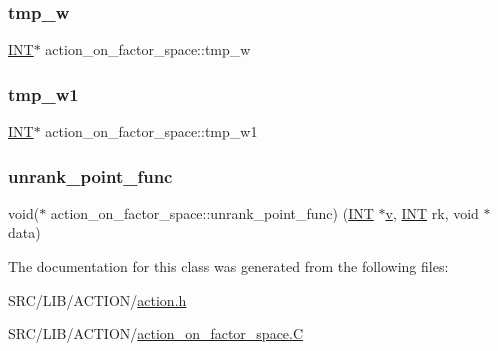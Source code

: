 \subsubsection{\texorpdfstring{tmp\+\_\+w}{tmp\_w}}
{\footnotesize\ttfamily \mbox{\hyperlink{galois_8h_a09fddde158a3a20bd2dcadb609de11dc}{I\+NT}}$\ast$ action\+\_\+on\+\_\+factor\+\_\+space\+::tmp\+\_\+w}

\mbox{\label{classaction__on__factor__space_a166179f9ef7f3e7cba7e2a4f7cd62341}} 
\subsubsection{\texorpdfstring{tmp\+\_\+w1}{tmp\_w1}}
{\footnotesize\ttfamily \mbox{\hyperlink{galois_8h_a09fddde158a3a20bd2dcadb609de11dc}{I\+NT}}$\ast$ action\+\_\+on\+\_\+factor\+\_\+space\+::tmp\+\_\+w1}

\mbox{\label{classaction__on__factor__space_ae22a1e77aff9c3afbb2f0f49e48cd89b}} 
\subsubsection{\texorpdfstring{unrank\+\_\+point\+\_\+func}{unrank\_point\_func}}
{\footnotesize\ttfamily void($\ast$ action\+\_\+on\+\_\+factor\+\_\+space\+::unrank\+\_\+point\+\_\+func) (\mbox{\hyperlink{galois_8h_a09fddde158a3a20bd2dcadb609de11dc}{I\+NT}} $\ast$\mbox{\hyperlink{simeon_8_c_aeb3f3030944801b163bc3b829a7f6710}{v}}, \mbox{\hyperlink{galois_8h_a09fddde158a3a20bd2dcadb609de11dc}{I\+NT}} rk, void $\ast$data)}



The documentation for this class was generated from the following files\+:\begin{DoxyCompactItemize}
\item 
S\+R\+C/\+L\+I\+B/\+A\+C\+T\+I\+O\+N/\mbox{\hyperlink{action_8h}{action.\+h}}\item 
S\+R\+C/\+L\+I\+B/\+A\+C\+T\+I\+O\+N/\mbox{\hyperlink{action__on__factor__space_8_c}{action\+\_\+on\+\_\+factor\+\_\+space.\+C}}\end{DoxyCompactItemize}
